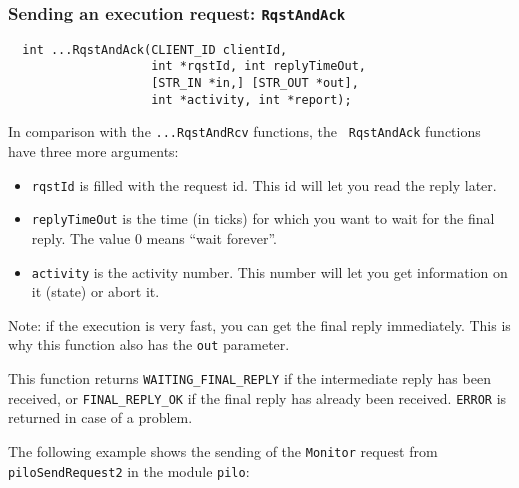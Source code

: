 \subsubsection{Sending an execution request: {\tt RqstAndAck}}

\begin{center}\begin{cartouche}\small\begin{verbatim}
  int ...RqstAndAck(CLIENT_ID clientId,
                    int *rqstId, int replyTimeOut,
                    [STR_IN *in,] [STR_OUT *out],
                    int *activity, int *report);
\end{verbatim}\end{cartouche}\end{center}

In comparison with the {\tt ...RqstAndRcv} functions, the {\tt
RqstAndAck} functions have three more arguments:

\begin{itemize}
\item {\tt rqstId} is filled with the request id. This id will let you
read the reply later.

\item {\tt replyTimeOut} is the time (in ticks) for which you want to
wait for the final reply. The value $0$ means ``wait forever''. 

\item {\tt activity} is the activity number. This number will let you get
information on it (state) or abort it.
\end{itemize}

Note: if    the execution is  very   fast, you can   get the  final reply
immediately. This is why this function also has the {\tt out} parameter.

This function returns {\tt   WAITING\_FINAL\_REPLY} if the   intermediate
reply has been received, or {\tt FINAL\_REPLY\_OK} if the final reply has
already been received. {\tt ERROR} is returned in case of a problem.

\bigbreak

The following example shows the sending of the {\tt Monitor} request from
{\tt piloSendRequest2} in the module {\tt pilo}:

